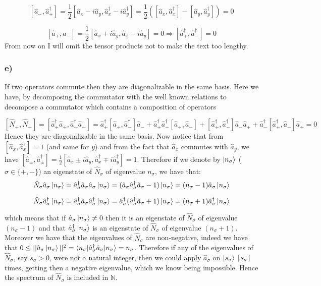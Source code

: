 \documentclass[10pt,a4paper]{book}
\DeclarePairedDelimiter{\ceil}{\lceil}{\rceil}
\begin{document}
$$[\hat{a}_-,\hat{a}_+^{\dagger}]=\frac{1}{2}[\hat{a}_x-i\hat{a}_y,\hat{a}_x^{\dagger}-i\hat{a}^{\dagger}_y]=\frac{1}{2}([\hat{a}_x,\hat{a}_x^{\dagger}]-[\hat{a}_y,\hat{a}_y^{\dagger}])=0$$

$$[\hat{a}_+,\hat{a}_-]=\frac{1}{2}[\hat{a}_x+i\hat{a}_y,\hat{a}_x-i\hat{a}_y]=0\Rightarrow [\hat{a}_+^{\dagger},\hat{a}_-^{\dagger}]=0$$
From now on I will omit the tensor products not to make the text too lengthy.

\subsubsection*{e)}
If two operators commute then they are diagonalizable in the same basis. Here we have, by decomposing the commutator with the well known relations to decompose a commutator which contains a  composition of operators

$$[\hat{N}_{+},\hat{N}_-]=[\hat{a}_+^{\dagger}\hat{a}_+,\hat{a}_-^{\dagger}\hat{a}_-]=\hat{a}_+^{\dagger}[\hat{a}_+,\hat{a}_-^{\dagger}]\hat{a}_-+
\hat{a}_+^{\dagger}\hat{a}_-^{\dagger}[\hat{a}_+,\hat{a}_-]+[\hat{a}_+^{\dagger},\hat{a}_-^{\dagger}]\hat{a}_-\hat{a}_++\hat{a}_-^{\dagger}[\hat{a}_+^{\dagger},\hat{a}_-]\hat{a}_+=0
$$
Hence they are diagonalizable in the same basis.
Now notice that from $[\hat{a}_x,\hat{a}_x^{\dagger}]=1$ (and same for $y$) and from the fact that $\hat{a}_x$ commutes with $\hat{a}_y$, we have $[\hat{a}_{\pm},\hat{a}_{\pm}^{\dagger}]=\frac{1}{2}[\hat{a}_x\pm i\hat{a}_y,\hat{a}_x^{\dagger}\mp i\hat{a}_y^{\dagger}]=1$.
Therefore if we denote by $\ket{n_{\sigma}}$ ($\sigma\in\{+,-\}$) an eigenstate of $\hat{N}_{\sigma}$ of eigenvalue $n_{\sigma}$, we have that:
$$\hat{N}_{\sigma}\hat{a}_{\sigma}\ket{n_{\sigma}}=\hat{a}_{\sigma}^{\dagger}\hat{a}_{\sigma}\hat{a}_{\sigma}\ket{n_{\sigma}}=(\hat{a}_{\sigma}\hat{a}_{\sigma}^{\dagger}\hat{a}_{\sigma}-1)\ket{n_{\sigma}}=(n_{\sigma}-1)\hat{a}_{\sigma}\ket{n_{\sigma}}$$

$$\hat{N}_{\sigma}\hat{a}_{\sigma}^{\dagger}\ket{n_{\sigma}}=\hat{a}_{\sigma}^{\dagger}\hat{a}_{\sigma}\hat{a}_{\sigma}^{\dagger}\ket{n_{\sigma}}=\hat{a}_{\sigma}^{\dagger}(\hat{a}_{\sigma}^{\dagger}\hat{a}_{\sigma}+1)\ket{n_{\sigma}}=(n_{\sigma}+1)\hat{a}_{\sigma}^{\dagger}\ket{n_{\sigma}}$$

which means that if $\hat{a}_{\sigma}\ket{n_{\sigma}}\neq 0$ then it is an eigenstate of $\hat{N}_{\sigma}$ of eigenvalue $(n_{\sigma}-1)$ and that $\hat{a}_{\sigma}^{\dagger}\ket{n_{\sigma}}$ is an eigenstate of $\hat{N}_{\sigma}$ of eigenvalue $(n_{\sigma}+1)$. Moreover we have that the eigenvalues of $\hat{N}_{\sigma}$ are non-negative, indeed we have that $0\leq ||\hat{a}_{\sigma}\ket{n_{\sigma}}||^2=\braket{n_{\sigma}|\hat{a}_{\sigma}^{\dagger}\hat{a}_{\sigma}|n_{\sigma}}=n_{\sigma}$. Therefore if any of the eigenvalues of $\hat{N}_{\sigma}$, say $s_{\sigma}>0$, were not a natural integer, then we could apply $\hat{a}_{\sigma}$ on $\ket{s_{\sigma}}$ $\ceil*{s_{\sigma}}$ times, getting then a negative eigenvalue, which we know being impossible. Hence the spectrum of $\hat{N}_{\sigma}$ is included in $\mathbb{N}$.
\end{document}
